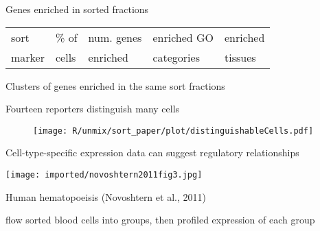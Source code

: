 \documentclass[serif,9pt]{beamer}
\begin{document}
\begin{frame}{Genes enriched in sorted fractions}

\begin{table}\footnotesize
\begin{tabular}{lllll}
sort & \% of & num. genes & enriched GO & enriched \\
marker & cells & enriched & categories & tissues \\
\hline

\end{tabular}
\end{table}

\end{frame}

\begin{frame}{Clusters of genes enriched in the same sort fractions}



\end{frame}

\begin{frame}{Fourteen reporters distinguish many cells}

\begin{figure}
\begin{centering}
\texttt{[image: R/unmix/sort\_paper/plot/distinguishableCells.pdf]}

\end{centering}
\end{figure}

\end{frame}

\begin{frame}{Cell-type-specific expression data can suggest regulatory relationships}

\texttt{[image: imported/novoshtern2011fig3.jpg]}

Human hematopoeisis (Novoshtern et al., 2011)

{\small flow sorted blood cells into groups, then profiled expression of each group}

\end{frame}
\end{document}
